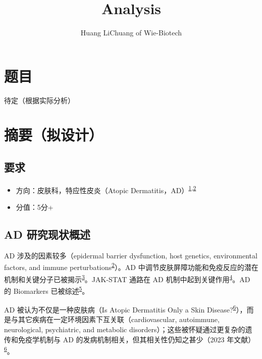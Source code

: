\documentclass[
]{article}
\title{Analysis}
\author{Huang LiChuang of Wie-Biotech}
\date{}
\providecommand{\tightlist}{%
  \setlength{\itemsep}{0pt}\setlength{\parskip}{0pt}}
\begin{document}
\maketitle

{
\setcounter{tocdepth}{3}
\tableofcontents
}
\listoffigures

\listoftables

\hypertarget{ux9898ux76ee}{%
\section{题目}\label{ux9898ux76ee}}

待定（根据实际分析）

\hypertarget{abstract}{%
\section{摘要（拟设计）}\label{abstract}}

\hypertarget{ux8981ux6c42}{%
\subsection{要求}\label{ux8981ux6c42}}

\begin{itemize}
\tightlist
\item
  方向：皮肤科，特应性皮炎（Atopic Dermatitis，AD）\textsuperscript{\protect\hyperlink{ref-MolecularMechaSroka2021}{1},\protect\hyperlink{ref-FromEmollientsSalvat2021}{2}}
\item
  分值：5分+
\end{itemize}

\hypertarget{ad-ux7814ux7a76ux73b0ux72b6ux6982ux8ff0}{%
\subsection{AD 研究现状概述}\label{ad-ux7814ux7a76ux73b0ux72b6ux6982ux8ff0}}

AD 涉及的因素较多（epidermal barrier dysfunction, host genetics, environmental factors, and immune perturbations\textsuperscript{\protect\hyperlink{ref-FromEmollientsSalvat2021}{2}}）。AD 中调节皮肤屏障功能和免疫反应的潜在机制和关键分子已被揭示\textsuperscript{\protect\hyperlink{ref-SkinBarrierAbYang2020}{3}}。JAK-STAT 通路在 AD 机制中起到关键作用\textsuperscript{\protect\hyperlink{ref-JakStatSignalHuang2022}{4}}。AD 的 Biomarkers 已被综述\textsuperscript{\protect\hyperlink{ref-BiomarkersInABakker2023}{5}}。

AD 被认为不仅是一种皮肤病（Is Atopic Dermatitis Only a Skin Disease?\textsuperscript{\protect\hyperlink{ref-IsAtopicDermaMesjas2023}{6}}），而是与其它疾病在一定环境因素下互关联（cardiovascular, autoimmune, neurological, psychiatric, and metabolic disorders）；这些被怀疑通过更复杂的遗传和免疫学机制与 AD 的发病机制相关，但其相关性仍知之甚少（2023 年文献）\textsuperscript{\protect\hyperlink{ref-IsAtopicDermaMesjas2023}{6}}。
\end{document}
